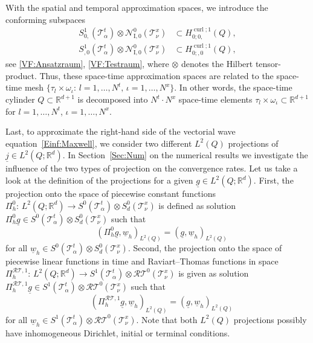 \documentclass[a4paper,11pt]{article}
\newcommand{\R}{\mathbb R}
\newcommand{\cu}{\operatorname{curl}}
\renewcommand{\vec}[1]{\underline{#1}}
\begin{document}
With the spatial and temporal approximation spaces, we introduce the conforming subspaces
\begin{align}
	S_{0,}^1(\mathcal T^t_\alpha) \otimes\mathcal N_\mathrm{I,0}^0(\mathcal T^x_\nu) &\subset H^{\cu;1}_{0;0,}(Q), \label{FES:TPSpaceA0}  \\
    S_{,0}^1(\mathcal T^t_\alpha) \otimes\mathcal N_\mathrm{I,0}^0(\mathcal T^x_\nu) &\subset H^{\cu;1}_{0;,0}(Q),  \label{FES:TPSpaceE0}
\end{align}
see \eqref{VF:Ansatzraum}, \eqref{VF:Testraum}, where $\otimes$ denotes the Hilbert tensor-product. Thus, these space-time approximation spaces are related to the space-time mesh $\{ \tau_l \times \omega_\iota : \, l=1,\dots,N^t, \, \iota = 1,\dots,N^x \}.$ In other words, the space-time cylinder $Q \subset \R^{d+1}$ is decomposed into $N^t \cdot N^x$ space-time elements $\tau_l \times \omega_\iota \subset \R^{d+1}$ for $l=1,\dots,N^t$, $\iota=1,\dots,N^x$.

Last, to approximate the right-hand side of the vectorial wave equation~\eqref{Einf:Maxwell}, we consider two different $L^2(Q)$ projections of $\vec j\in L^2(Q; \R^d)$. In Section~\ref{Sec:Num} on the numerical results we investigate the influence of the two types of projection on the convergence rates. Let us take a look at the definition of the projections for a given $\vec g \in L^2(Q; \R^d)$. First, the projection onto the space of piecewise constant functions $\Pi_h^0 \colon \, L^2(Q; \R^d) \to S^0(\mathcal T^t_\alpha) \otimes S_d^0(\mathcal T^x_\nu)$ is defined as solution $\Pi_h^0 \vec g \in S^0(\mathcal T^t_\alpha) \otimes S_d^0(\mathcal T^x_\nu)$ such that
\begin{equation} \label{FES:L2Konst}
 \quad (\Pi_h^0 \vec g, \vec w_h)_{L^2(Q)} = (\vec g, \vec w_h)_{L^2(Q)}
\end{equation}
for all $\vec w_h \in S^0(\mathcal T^t_\alpha) \otimes S_d^0(\mathcal T^x_\nu).$ Second, the projection onto the space of piecewise linear functions in time and Raviart--Thomas functions in space $\Pi_h^{\mathcal{RT},1} \colon \, L^2(Q; \R^d) \to S^1(\mathcal T^t_\alpha) \otimes \mathcal{RT}^0(\mathcal T^x_\nu)$ is given as solution $\Pi_h^{\mathcal{RT},1} \vec g \in S^1(\mathcal T^t_\alpha) \otimes \mathcal{RT}^0(\mathcal T^x_\nu)$ such that
\begin{equation} \label{FES:L2RT}
\quad (\Pi_h^{\mathcal{RT},1} \vec g, \vec w_h)_{L^2(Q)} = (\vec g, \vec w_h)_{L^2(Q)}
\end{equation}
for all $\vec w_h \in S^1(\mathcal T^t_\alpha) \otimes \mathcal{RT}^0(\mathcal T^x_\nu).$ Note that both $L^2(Q)$ projections possibly have inhomogeneous Dirichlet, initial or terminal conditions.
\end{document}
